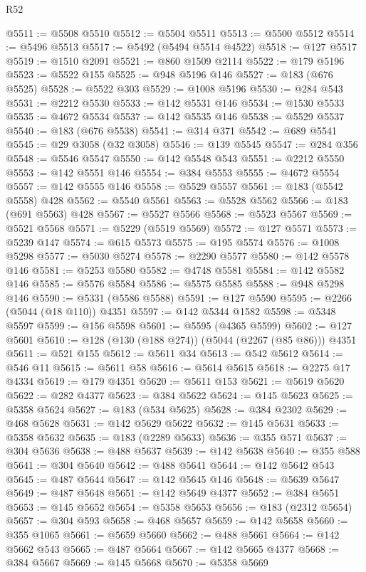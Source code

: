 \begin{lexlean}{R52}
\begin{coremodule}
{{{{{{{{{{{{{{{{{{{{{{{{{{{{{{{{{{{{{{{{{{{{{{{{{{{{{{{{{{{{{{{{{{{{{{{{{{{{{{{{{{{{{{{{{{{{{{{{{{{{{{{{{{{{{{{{{{{{{{{{{{{{{{{{{{{{{{{{{{{{{{{{{{{{{{{{{{{{{{{{{{{{{{{{{{{{{{{{{{{{{{{{{{{{{{{{{{{{{{@5511 := @5508 @5510
@5512 := @5504 @5511
@5513 := @5500 @5512
@5514 := @5496 @5513
@5517 := @5492 (@5494 @5514 @4522)
@5518 := @127 @5517
@5519 := @1510 @2091
@5521 := @860 @1509 @2114
@5522 := @179 @5196
@5523 := @5522 @155
@5525 := @948 @5196 @146
@5527 := @183 (@676 @5525)
@5528 := @5522 @303
@5529 := @1008 @5196
@5530 := @284 @543
@5531 := @2212 @5530
@5533 := @142 @5531 @146
@5534 := @1530 @5533
@5535 := @4672 @5534
@5537 := @142 @5535 @146
@5538 := @5529 @5537
@5540 := @183 (@676 @5538)
@5541 := @314 @371
@5542 := @689 @5541
@5545 := @29 @3058 (@32 @3058)
@5546 := @139 @5545
@5547 := @284 @356
@5548 := @5546 @5547
@5550 := @142 @5548 @543
@5551 := @2212 @5550
@5553 := @142 @5551 @146
@5554 := @384 @5553
@5555 := @4672 @5554
@5557 := @142 @5555 @146
@5558 := @5529 @5557
@5561 := @183 (@5542 @5558) @428
@5562 := @5540 @5561
@5563 := @5528 @5562
@5566 := @183 (@691 @5563) @428
@5567 := @5527 @5566
@5568 := @5523 @5567
@5569 := @5521 @5568
@5571 := @5229 (@5519 @5569)
@5572 := @127 @5571
@5573 := @5239 @147
@5574 := @615 @5573
@5575 := @195 @5574
@5576 := @1008 @5298
@5577 := @5030 @5274
@5578 := @2290 @5577
@5580 := @142 @5578 @146
@5581 := @5253 @5580
@5582 := @4748 @5581
@5584 := @142 @5582 @146
@5585 := @5576 @5584
@5586 := @5575 @5585
@5588 := @948 @5298 @146
@5590 := @5331 (@5586 @5588)
@5591 := @127 @5590
@5595 := @2266 (@5044 (@18 @110)) @4351
@5597 := @142 @5344 @1582
@5598 := @5348 @5597
@5599 := @156 @5598
@5601 := @5595 (@4365 @5599)
@5602 := @127 @5601
@5610 := @128 (@130 (@188 @274)) (@5044 (@2267 (@85 @86))) @4351
@5611 := @521 @155
@5612 := @5611 @34
@5613 := @542 @5612
@5614 := @546 @11
@5615 := @5611 @58
@5616 := @5614 @5615
@5618 := @2275 @17 @4334
@5619 := @179 @4351
@5620 := @5611 @153
@5621 := @5619 @5620
@5622 := @282 @4377
@5623 := @384 @5622
@5624 := @145 @5623
@5625 := @5358 @5624
@5627 := @183 (@534 @5625)
@5628 := @384 @2302
@5629 := @468 @5628
@5631 := @142 @5629 @5622
@5632 := @145 @5631
@5633 := @5358 @5632
@5635 := @183 (@2289 @5633)
@5636 := @355 @571
@5637 := @304 @5636
@5638 := @488 @5637
@5639 := @142 @5638
@5640 := @355 @588
@5641 := @304 @5640
@5642 := @488 @5641
@5644 := @142 @5642 @543
@5645 := @487 @5644
@5647 := @142 @5645 @146
@5648 := @5639 @5647
@5649 := @487 @5648
@5651 := @142 @5649 @4377
@5652 := @384 @5651
@5653 := @145 @5652
@5654 := @5358 @5653
@5656 := @183 (@2312 @5654)
@5657 := @304 @593
@5658 := @468 @5657
@5659 := @142 @5658
@5660 := @355 @1065
@5661 := @5659 @5660
@5662 := @488 @5661
@5664 := @142 @5662 @543
@5665 := @487 @5664
@5667 := @142 @5665 @4377
@5668 := @384 @5667
@5669 := @145 @5668
@5670 := @5358 @5669
}}}}}}}}}}}}}}}}}}}}}}}}}}}}}}}}}}}}}}}}}}}}}}}}}}}}}}}}}}}}}}}}}}}}}}}}}}}}}}}}}}}}}}}}}}}}}}}}}}}}}}}}}}}}}}}}}}}}}}}}}}}}}}}}}}}}}}}}}}}}}}}}}}}}}}}}}}}}}}}}}}}}}}}}}}}}}}}}}}}}}}}}}}}}}}}}}}}}}}
\end{coremodule}
\end{lexlean}
